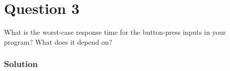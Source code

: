 \section*{Question 3}

What is the worst-case response time for the button-press inputs in your program?
What does it depend on?

\subsubsection*{Solution}

